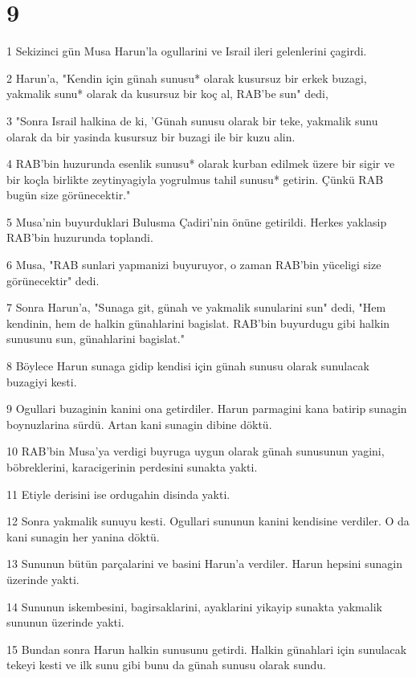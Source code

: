 \chapter{9}

\par 1 Sekizinci gün Musa Harun'la ogullarini ve Israil ileri gelenlerini çagirdi.
\par 2 Harun'a, "Kendin için günah sunusu* olarak kusursuz bir erkek buzagi, yakmalik sunu* olarak da kusursuz bir koç al, RAB'be sun" dedi,
\par 3 "Sonra Israil halkina de ki, 'Günah sunusu olarak bir teke, yakmalik sunu olarak da bir yasinda kusursuz bir buzagi ile bir kuzu alin.
\par 4 RAB'bin huzurunda esenlik sunusu* olarak kurban edilmek üzere bir sigir ve bir koçla birlikte zeytinyagiyla yogrulmus tahil sunusu* getirin. Çünkü RAB bugün size görünecektir."
\par 5 Musa'nin buyurduklari Bulusma Çadiri'nin önüne getirildi. Herkes yaklasip RAB'bin huzurunda toplandi.
\par 6 Musa, "RAB sunlari yapmanizi buyuruyor, o zaman RAB'bin yüceligi size görünecektir" dedi.
\par 7 Sonra Harun'a, "Sunaga git, günah ve yakmalik sunularini sun" dedi, "Hem kendinin, hem de halkin günahlarini bagislat. RAB'bin buyurdugu gibi halkin sunusunu sun, günahlarini bagislat."
\par 8 Böylece Harun sunaga gidip kendisi için günah sunusu olarak sunulacak buzagiyi kesti.
\par 9 Ogullari buzaginin kanini ona getirdiler. Harun parmagini kana batirip sunagin boynuzlarina sürdü. Artan kani sunagin dibine döktü.
\par 10 RAB'bin Musa'ya verdigi buyruga uygun olarak günah sunusunun yagini, böbreklerini, karacigerinin perdesini sunakta yakti.
\par 11 Etiyle derisini ise ordugahin disinda yakti.
\par 12 Sonra yakmalik sunuyu kesti. Ogullari sununun kanini kendisine verdiler. O da kani sunagin her yanina döktü.
\par 13 Sununun bütün parçalarini ve basini Harun'a verdiler. Harun hepsini sunagin üzerinde yakti.
\par 14 Sununun iskembesini, bagirsaklarini, ayaklarini yikayip sunakta yakmalik sununun üzerinde yakti.
\par 15 Bundan sonra Harun halkin sunusunu getirdi. Halkin günahlari için sunulacak tekeyi kesti ve ilk sunu gibi bunu da günah sunusu olarak sundu.
